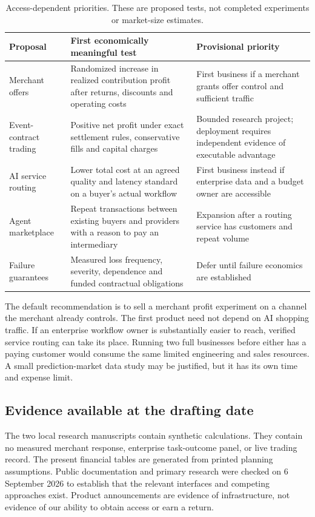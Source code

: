 \documentclass[11pt]{article}
\theoremstyle{remark}\newtheorem{example}{Example}
\begin{document}
\begin{table}[htbp]\centering\small
\begin{tabularx}{\textwidth}{p{}XX}
\toprule
Proposal & First economically meaningful test & Provisional priority \\
\midrule
Merchant offers & Randomized increase in realized contribution profit after
returns, discounts and operating costs & First business if a merchant grants
offer control and sufficient traffic \\
Event-contract trading & Positive net profit under exact settlement rules,
conservative fills and capital charges & Bounded research project; deployment
requires independent evidence of executable advantage \\
AI service routing & Lower total cost at an agreed quality and latency standard
on a buyer's actual workflow & First business instead if enterprise data and a
budget owner are accessible \\
Agent marketplace & Repeat transactions between existing buyers and providers
with a reason to pay an intermediary & Expansion after a routing service has
customers and repeat volume \\
Failure guarantees & Measured loss frequency, severity, dependence and funded
contractual obligations & Defer until failure economics are established \\
\bottomrule
\end{tabularx}
\caption{Access-dependent priorities. These are proposed tests, not completed
experiments or market-size estimates.}\label{tab:ranking}
\end{table}

The default recommendation is to sell a merchant profit experiment on a channel
the merchant already controls. The first product need not depend on AI shopping
traffic. If an enterprise workflow owner is substantially easier to reach,
verified service routing can take its place. Running two full businesses before
either has a paying customer would consume the same limited engineering and
sales resources. A small prediction-market data study may be justified, but it
has its own time and expense limit.

\subsection{Evidence available at the drafting date}
The two local research manuscripts contain synthetic calculations. They contain
no measured merchant response, enterprise task-outcome panel, or live trading
record. The present financial tables are generated from printed planning
assumptions. Public documentation and primary research were checked on
6 September 2026 to establish that the relevant interfaces and competing
approaches exist. Product announcements are evidence of infrastructure, not
evidence of our ability to obtain access or earn a return.
\end{document}
